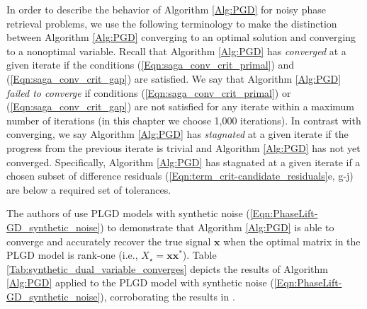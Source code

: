 In order to describe the behavior of Algorithm \ref{Alg:PGD} for noisy phase retrieval problems, we use the following terminology to make the distinction between Algorithm \ref{Alg:PGD} converging to an optimal solution and converging to a nonoptimal variable.
Recall that Algorithm \ref{Alg:PGD} has \textit{converged} at a given iterate if the conditions (\ref{Eqn:saga_conv_crit_primal}) and (\ref{Eqn:saga_conv_crit_gap}) are satisfied.  
We say that Algorithm \ref{Alg:PGD} \textit{failed to converge} if conditions (\ref{Eqn:saga_conv_crit_primal}) or (\ref{Eqn:saga_conv_crit_gap}) are not satisfied for any iterate within a maximum number of iterations (in this chapter we choose 1,000 iterations).
In contrast with converging, we say Algorithm \ref{Alg:PGD} has \textit{stagnated} at a given iterate if the progress from the previous iterate is trivial and Algorithm \ref{Alg:PGD} has not yet converged.
Specifically, Algorithm \ref{Alg:PGD} has stagnated at a given iterate if a chosen subset of difference residuals (\ref{Eqn:term_crit-candidate_residuals}e, g-j) are below a required set of tolerances.











The authors of \cite{DBLP:journals/siamsc/FriedlanderM16} use PLGD models with synthetic noise (\ref{Eqn:PhaseLift-GD_synthetic_noise}) to demonstrate that Algorithm \ref{Alg:PGD} is able to converge and accurately recover the true signal $\mathbf{x}$ when the optimal matrix in the PLGD model is rank-one (i.e., $X_\star = \mathbf{x} \mathbf{x}^*$).  
Table \ref{Tab:synthetic_dual_variable_converges} depicts the results of Algorithm \ref{Alg:PGD} applied to the PLGD model with synthetic noise (\ref{Eqn:PhaseLift-GD_synthetic_noise}), corroborating the results in \cite[Section 5.1.2]{DBLP:journals/siamsc/FriedlanderM16}.

